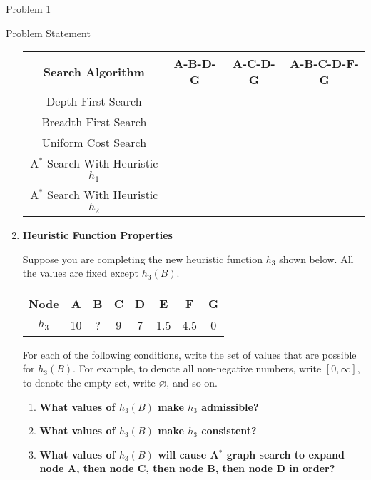 \begin{problem}{Problem 1}
\begin{statement}{Problem Statement}
\begin{enumerate}[label = {\textbf{(\alph*)}}]
            \begin{center}
                \begin{tabular}[h]{|c|c|c|c|}
                    \hline Search Algorithm & \textbf{A-B-D-G} & \textbf{A-C-D-G} & \textbf{A-B-C-D-F-G} \\ \hline
                    Depth First Search & & & \\ \hline
                    Breadth First Search & & & \\ \hline
                    Uniform Cost Search & & & \\ \hline
                    A$^{*}$ Search With Heuristic $h_{1}$ & & & \\ \hline
                    A$^{*}$ Search With Heuristic $h_{2}$ & & & \\ \hline
                \end{tabular}
            \end{center}
            \item \textbf{Heuristic Function Properties}
            
            Suppose you are completing the new heuristic function $h_{3}$ shown below. All the values are fixed except $h_{3}(B)$.

            \begin{center}
                \begin{tabular}[h]{|c|c|c|c|c|c|c|c|}
                    \hline Node & A & B & C & D & E & F & G \\ \hline
                    $h_{3}$ & 10 & ? & 9 & 7 & 1.5 & 4.5 & 0 \\ \hline
                \end{tabular}
            \end{center}
            For each of the following conditions, write the set of values that are possible for $h_{3}(B)$. For example, to denote all non-negative numbers, write $[0, \infty]$, to denote the empty set, write $\varnothing$, and so on.

            \begin{enumerate}[label = {\textbf{(\roman*)}}]
                \item \textbf{What values of $h_{3}(B)$ make $h_{3}$ admissible?}
                \item \textbf{What values of $h_{3}(B)$ make $h_{3}$ consistent?}
                \item \textbf{What values of $h_{3}(B)$ will cause A$^{*}$ graph search to expand node A, then node C, then node B, then node D in order?}
            \end{enumerate}
        \end{enumerate}
    \end{statement}


\end{problem}
